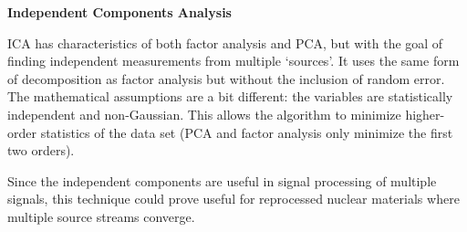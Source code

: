 \vspace{5mm} \noindent \textbf{Independent Components Analysis} \vspace{5mm}

\Gls{ICA} has characteristics of both factor analysis and \gls{PCA}, but with
the goal of finding independent measurements from multiple `sources'.  It uses
the same form of decomposition as factor analysis but without the inclusion of
random error. The mathematical assumptions are a bit different: the variables
are statistically independent and non-Gaussian.  This allows the algorithm to
minimize higher-order statistics of the data set (\gls{PCA} and factor analysis
only minimize the first two orders).

Since the independent components are useful in signal processing of multiple
signals, this technique could prove useful for reprocessed nuclear materials
where multiple source streams converge. 

